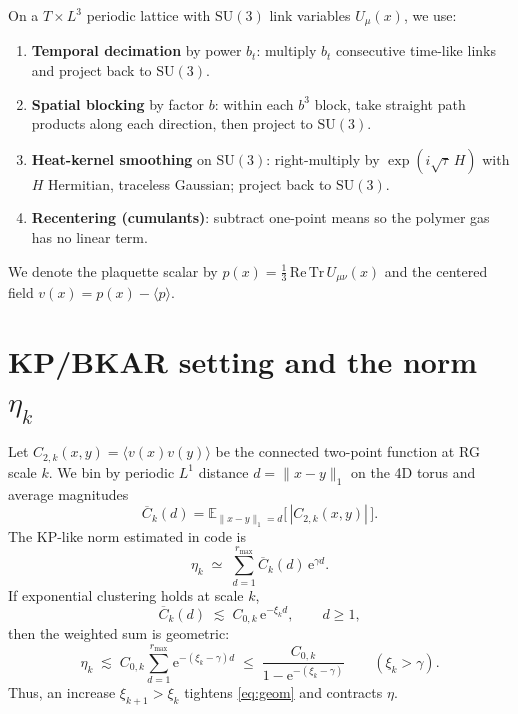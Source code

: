 \documentclass[11pt]{article}
\newcommand{\e}{\mathrm{e}}
\begin{document}
On a $T\times L^3$ periodic lattice with $\mathrm{SU}(3)$ link variables $U_\mu(x)$, we use:
\begin{enumerate}
  \item \textbf{Temporal decimation} by power $b_t$: multiply $b_t$ consecutive time-like links and project back to $\mathrm{SU}(3)$.
  \item \textbf{Spatial blocking} by factor $b$: within each $b^3$ block, take straight path products along each direction, then project to $\mathrm{SU}(3)$.
  \item \textbf{Heat-kernel smoothing} on $\mathrm{SU}(3)$: right-multiply by $\exp(i\sqrt{\tau}\,H)$ with $H$ Hermitian, traceless Gaussian; project back to $\mathrm{SU}(3)$.
  \item \textbf{Recentering (cumulants)}: subtract one-point means so the polymer gas has no linear term.
\end{enumerate}
We denote the plaquette scalar by $p(x)=\frac{1}{3}\,\mathrm{Re}\,\mathrm{Tr}\,U_{\mu\nu}(x)$ and the centered field $v(x)=p(x)-\langle p\rangle$.

\section{KP/BKAR setting and the norm \texorpdfstring{$\eta_k$}{eta}}

Let $C_{2,k}(x,y)=\langle v(x)v(y)\rangle$ be the connected two-point function at RG scale $k$. We bin by periodic $L^1$ distance $d=\|x-y\|_1$ on the 4D torus and average magnitudes
\[
\overline{C}_k(d)= \mathbb{E}_{\|x-y\|_1=d}\!\bigl[\,|C_{2,k}(x,y)|\,\bigr].
\]
The KP-like norm estimated in code is
\begin{equation}
   \eta_k \;\simeq\; \sum_{d=1}^{r_{\max}} \overline{C}_k(d)\,\e^{\gamma d}.
   \label{eq:kpnorm}
\end{equation}
If exponential clustering holds at scale $k$,
\begin{equation}
   \overline{C}_k(d) \;\lesssim\; C_{0,k}\,\e^{-\xi_k d},\qquad d\ge 1,
   \label{eq:expclust}
\end{equation}
then the weighted sum is geometric:
\begin{equation}
  \eta_k \;\lesssim\; C_{0,k}\sum_{d=1}^{r_{\max}} \e^{-(\xi_k-\gamma)d}
  \;\le\; \frac{C_{0,k}}{1-\e^{-(\xi_k-\gamma)}}\qquad(\xi_k>\gamma).
  \label{eq:geom}
\end{equation}
Thus, an increase $\xi_{k+1}>\xi_k$ tightens \eqref{eq:geom} and contracts $\eta$.
\end{document}
